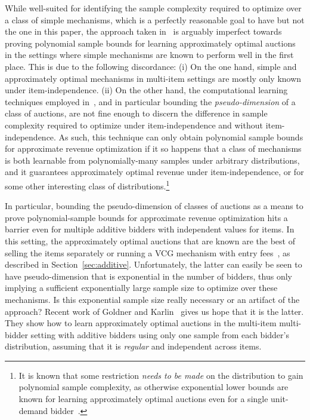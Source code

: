 While well-suited for identifying the sample complexity required to optimize over a class of simple mechanisms, which is a perfectly reasonable goal to have but not the one in this paper, the approach taken in~\cite{MorgensternR16} is arguably imperfect towards proving polynomial sample bounds for learning approximately optimal auctions in the settings where simple mechanisms are known to perform well in the first place. This is due to the following discordance: (i) On the one hand, simple and approximately optimal mechanisms in multi-item settings are mostly only known under item-independence. (ii) On the other hand, the computational learning techniques employed in~\cite{MorgensternR16}, and in particular bounding the {\em pseudo-dimension} of a class of auctions, are not fine enough to discern the difference in sample complexity required to optimize under item-independence and without item-independence. As such, this technique can only obtain polynomial sample bounds for approximate revenue optimization if it so happens that a class of mechanisms is both learnable from polynomially-many samples under arbitrary distributions, and it guarantees approximately optimal revenue under item-independence, or for some other interesting class of distributions.\footnote{It is known that some restriction {\em needs to be made} on the distribution to gain polynomial sample complexity, as otherwise exponential lower bounds are known for learning approximately optimal auctions even for a single unit-demand bidder~\cite{DughmiHN14}.} 

In particular, bounding the pseudo-dimension of classes of auctions as a means to prove polynomial-sample bounds for approximate revenue optimization hits a barrier even for multiple additive bidders with independent values for items. In this setting, the approximately optimal auctions that are known are the best of selling the items separately or running a VCG mechanism with entry fees~\cite{Yao15,CaiDW16}, as described in Section~\ref{sec:additive}. Unfortunately, the latter can easily be seen to have pseudo-dimension that is exponential in the number of bidders, thus only implying a sufficient exponentially large sample size to optimize over these mechanisms. Is this exponential sample size really necessary or an artifact of the approach? Recent work of Goldner and Karlin~\cite{GoldnerK16} gives us hope that it is the latter. They show how to learn approximately optimal auctions in the multi-item multi-bidder setting with additive bidders using only one sample from each bidder's distribution, assuming that it is {\em regular} and independent across items. 

